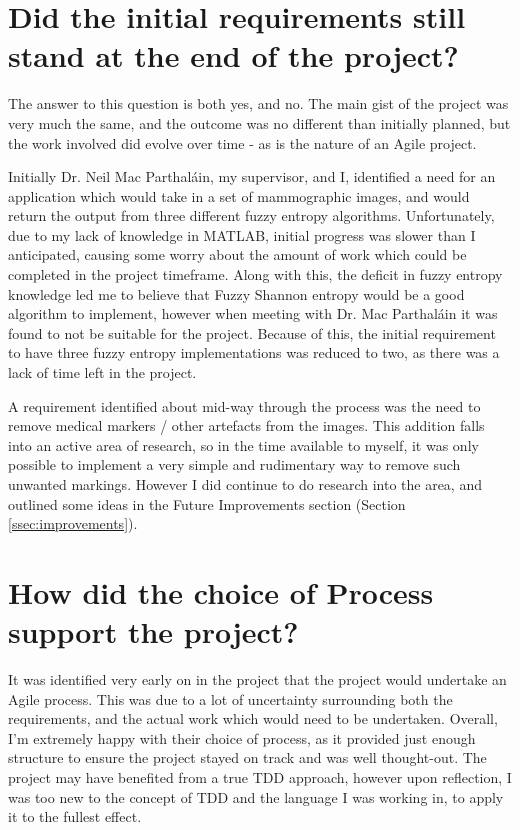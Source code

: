 \section{Did the initial requirements still stand at the end of the project?}

The answer to this question is both yes, and no. The main gist of the project was very much the same, and the outcome was no different than initially planned, but the work involved did evolve over time - as is the nature of an Agile project.

Initially Dr. Neil Mac Parthal\'ain, my supervisor, and I, identified a need for an application which would take in a set of \gls{mammographic images}, and would return the output from three different fuzzy entropy algorithms. Unfortunately, due to my lack of knowledge in MATLAB, initial progress was slower than I anticipated, causing some worry about the amount of work which could be completed in the project timeframe. Along with this, the deficit in fuzzy entropy knowledge led me to believe that Fuzzy Shannon entropy would be a good algorithm to implement, however when meeting with Dr. Mac Parthal\'ain it was found to not be suitable for the project. Because of this, the initial requirement to have three fuzzy entropy implementations was reduced to two, as there was a lack of time left in the project.

A requirement identified about mid-way through the process was the need to remove medical markers / other artefacts from the images. This addition falls into an active area of research, so in the time available to myself, it was only possible to implement a very simple and rudimentary way to remove such unwanted markings. However I did continue to do research into the area, and outlined some ideas in the Future Improvements section (Section \ref{ssec:improvements}).

\section{How did the choice of Process support the project?}

It was identified very early on in the project that the project would undertake an Agile process. This was due to a lot of uncertainty surrounding both the requirements, and the actual work which would need to be undertaken. Overall, I'm extremely happy with their choice of process, as it provided just enough structure to ensure the project stayed on track and was well thought-out. The project may have benefited from a true \acrshort{TDD} approach, however upon reflection, I was too new to the concept of \acrshort{TDD} and the language I was working in, to apply it to the fullest effect.

